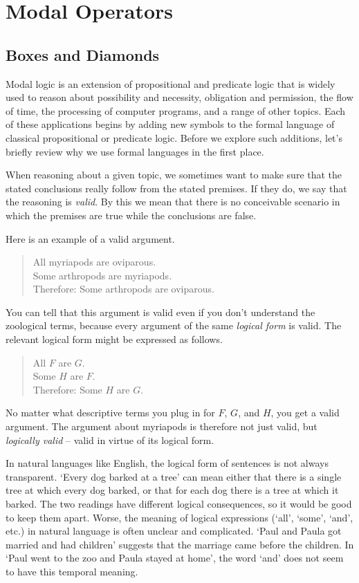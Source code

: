 \chapter{Modal Operators}\label{ch:operators}

\section{Boxes and Diamonds}
\label{sec:intro}

Modal logic is an extension of propositional and predicate logic that is widely
used to reason about possibility and necessity, obligation and permission, the
flow of time, the processing of computer programs, and a range of other topics.
Each of these applications begins by adding new symbols to the formal language
of classical propositional or predicate logic. Before we explore such additions,
let's briefly review why we use formal languages in the first place.

When reasoning about a given topic, we sometimes want to make sure that the
stated conclusions really follow from the stated premises. If they do, we say
that the reasoning is \emph{valid}. By this we mean that there is no conceivable
scenario in which the premises are true while the conclusions are false.

Here is an example of a valid argument.
%
\begin{quote}
  All myriapods are oviparous.\\
  Some arthropods are myriapods.\\
  Therefore: Some arthropods are oviparous.
\end{quote}
%
You can tell that this argument is valid even if you don't understand the
zoological terms, because every argument of the same \emph{logical form} is
valid. The relevant logical form might be expressed as follows.
%
\begin{quote}
  All $F$ are $G$.\\
  Some $H$ are $F$.\\
  Therefore: Some $H$ are $G$.
\end{quote}
%
No matter what descriptive terms you plug in for $F$, $G$, and $H$, you get a
valid argument. The argument about myriapods is therefore not just valid, but
\emph{logically valid} -- valid in virtue of its logical form.

In natural languages like English, the logical form of sentences is not always
transparent. `Every dog barked at a tree' can mean either that there is a single
tree at which every dog barked, or that for each dog there is a tree at which it
barked. The two readings have different logical consequences, so it would be
good to keep them apart. Worse, the meaning of logical expressions (`all',
`some', `and', etc.) in natural language is often unclear and complicated. `Paul
and Paula got married and had children' suggests that the marriage came before
the children. In `Paul went to the zoo and Paula stayed at home', the word `and'
does not seem to have this temporal meaning.

